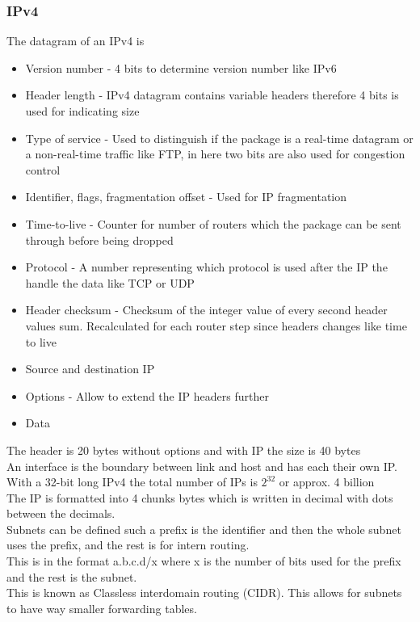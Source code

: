 \documentclass[12pt, a4paper]{article}
\begin{document}
			\subsubsection{IPv4}
				The datagram of an IPv4 is
				\begin{itemize}
					\item Version number - 4 bits to determine version number like IPv6
					\item Header length - IPv4 datagram contains variable headers therefore 4 bits is used for indicating size
					\item Type of service - Used to distinguish if the package is a real-time datagram or a non-real-time traffic like FTP, in here two bits are also used for congestion control
					\item Identifier, flags, fragmentation offset - Used for IP fragmentation 
					\item Time-to-live - Counter for number of routers which the package can be sent through before being dropped
					\item Protocol - A number representing which protocol is used after the IP the handle the data like TCP or UDP
					\item Header checksum - Checksum of the integer value of every second header values sum. Recalculated for each router step since headers changes like time to live
					\item Source and destination IP
					\item Options - Allow to extend the IP headers further
					\item Data
				\end{itemize}
				The header is 20 bytes without options and with IP the size is 40 bytes\\
				An interface is the boundary between link and host and has each their own IP.\\
				With a 32-bit long IPv4 the total number of IPs is $2^{32}$ or approx. 4 billion\\
				The IP is formatted into 4 chunks bytes which is written in decimal with dots between the decimals.\\
				Subnets can be defined such a prefix is the identifier and then the whole subnet uses the prefix, and the rest is for intern routing.\\
				This is in the format a.b.c.d/x where x is the number of bits used for the prefix and the rest is the subnet.\\
				This is known as Classless interdomain routing (CIDR). This allows for subnets to have way smaller forwarding tables.\\
\end{document}
